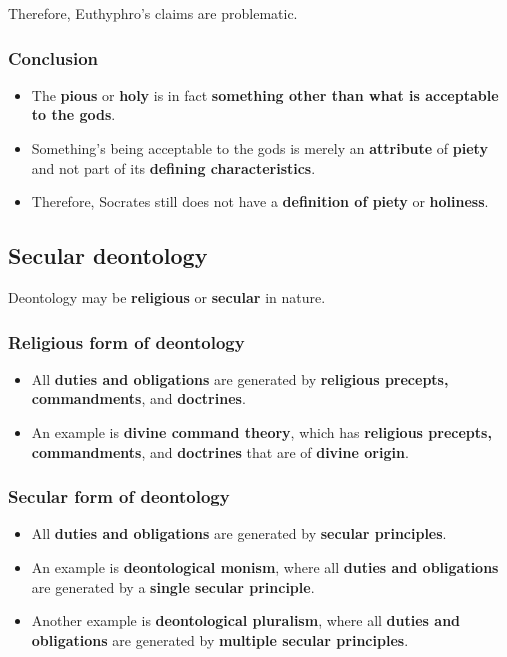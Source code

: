 \documentclass[11pt]{article}
\begin{document}
Therefore, Euthyphro's claims are problematic.
\subsubsection{Conclusion}
\label{sec:org0e99a28}
\begin{itemize}
\item The \textbf{pious} or \textbf{holy} is in fact \textbf{something other than what is acceptable to the gods}.
\item Something's being acceptable to the gods is merely an \textbf{attribute} of \textbf{piety} and not part of its \textbf{defining characteristics}.
\item Therefore, Socrates still does not have a \textbf{definition of piety} or \textbf{holiness}.
\end{itemize}

 \newpage
\subsection{Secular deontology}
\label{sec:org12ce1ef}
Deontology may be \textbf{religious} or \textbf{secular} in nature.
\subsubsection{Religious form of deontology}
\label{sec:org7dbf940}
\begin{itemize}
\item All \textbf{duties and obligations} are generated by \textbf{religious precepts, commandments}, and \textbf{doctrines}.
\item An example is \textbf{divine command theory}, which has \textbf{religious precepts, commandments}, and \textbf{doctrines} that are of \textbf{divine origin}.
\end{itemize}
\subsubsection{Secular form of deontology}
\label{sec:orgf78ca39}
\begin{itemize}
\item All \textbf{duties and obligations} are generated by \textbf{secular principles}.
\item An example is \textbf{deontological monism}, where all \textbf{duties and obligations} are generated by a \textbf{single secular principle}.
\item Another example is \textbf{deontological pluralism}, where all \textbf{duties and obligations} are generated by \textbf{multiple secular principles}.
\end{itemize}
\end{document}
